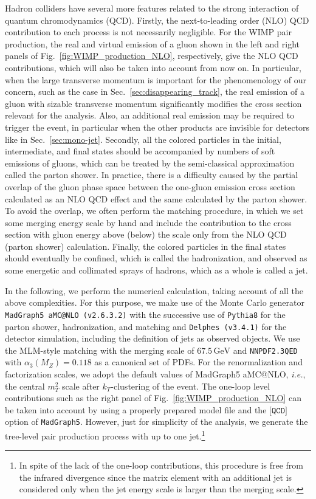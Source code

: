 \documentclass[12pt,twoside,book]{article}
\begin{document}
Hadron colliders have several more features related to the strong interaction of quantum chromodynamics (QCD).
Firstly, the next-to-leading order (NLO) QCD contribution to each process is not necessarily negligible.
For the WIMP pair production, the real and virtual emission of a gluon shown in the left and right panels of Fig.~\ref{fig:WIMP_production_NLO}, respectively, give the NLO QCD contributions, which will also be taken into account from now on.
In particular, when the large transverse momentum is important for the phenomenology of our concern, such as the case in Sec.~\ref{sec:disappearing_track}, the real emission of a gluon with sizable transverse momentum significantly modifies the cross section relevant for the analysis.
Also, an additional real emission may be required to trigger the event, in particular when the other products are invisible for detectors like in Sec.~\ref{sec:mono-jet}.
Secondly, all the colored particles in the initial, intermediate, and final states should be accompanied by numbers of soft emissions of gluons, which can be treated by the semi-classical approximation called the parton shower.
In practice, there is a difficulty caused by the partial overlap of the gluon phase space between the one-gluon emission cross section calculated as an NLO QCD effect and the same calculated by the parton shower.
To avoid the overlap, we often perform the matching procedure, in which we set some merging energy scale by hand and include the contribution to the cross section with gluon energy above (below) the scale only from the NLO QCD (parton shower) calculation.
Finally, the colored particles in the final states should eventually be confined, which is called the hadronization, and observed as some energetic and collimated sprays of hadrons, which as a whole is called a jet.

In the following, we perform the numerical calculation, taking account of all the above complexities.
For this purpose, we make use of the Monte Carlo generator \texttt{MadGraph5 aMC@NLO (v2.6.3.2)} \cite{Alwall:2011uj,Alwall:2014hca} with the successive use of \texttt{Pythia8} \cite{Sjostrand:2014zea} for the parton shower, hadronization, and matching and \texttt{Delphes (v3.4.1)} \cite{deFavereau:2013fsa} for the detector simulation, including the definition of jets as observed objects.
We use the MLM-style matching \cite{Mangano:2006rw} with the merging scale of $67.5\,\mathrm{GeV}$ and \texttt{NNPDF2.3QED} with $\alpha_3 (M_Z) = 0.118$ \cite{Ball:2013hta} as a canonical set of PDFs.
For the renormalization and factorization scales, we adopt the default values of MadGraph5 aMC@NLO, \textit{i.e.}, the central $m^2_T$ scale after $k_T$-clustering of the event.
The one-loop level contributions such as the right panel of Fig.~\ref{fig:WIMP_production_NLO} can be taken into account by using a properly prepared model file and the $\texttt{[QCD]}$ option of \texttt{MadGraph5}.
However, just for simplicity of the analysis, we generate the tree-level pair production process with up to one jet.\footnote{
  In spite of the lack of the one-loop contributions, this procedure is free from the infrared divergence since the matrix element with an additional jet is considered only when the jet energy scale is larger than the merging scale.
}
\end{document}
